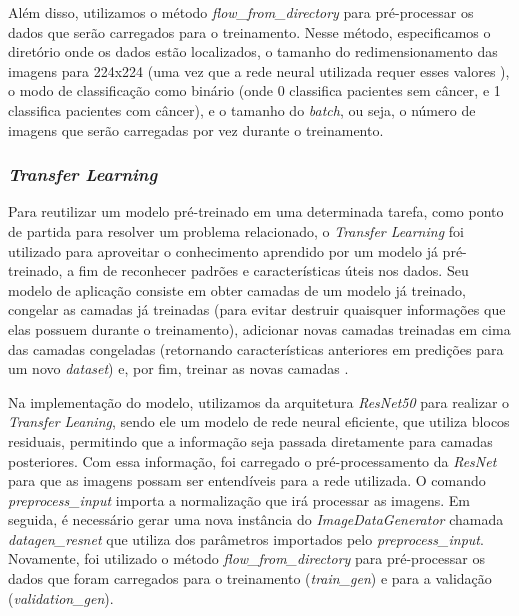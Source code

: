 Além disso, utilizamos o método \textit{flow\_from\_directory} para pré-processar os dados que serão carregados para o treinamento. Nesse método, especificamos o diretório onde os dados estão localizados, o tamanho do redimensionamento das imagens para 224x224 (uma vez que a rede neural utilizada requer esses valores ), o modo de classificação como binário (onde 0 classifica pacientes sem câncer, e 1 classifica pacientes com câncer), e o tamanho do \textit{batch}, ou seja, o número de imagens que serão carregadas por vez durante o treinamento.


\subsubsection{\esp \textit{Transfer Learning}} \label{transfer}
Para reutilizar um modelo pré-treinado em uma determinada tarefa, como ponto de partida para resolver um problema relacionado, o \textit{Transfer Learning} foi utilizado para aproveitar o conhecimento aprendido por um modelo já pré-treinado, a fim de reconhecer padrões e características úteis nos dados. Seu modelo de aplicação consiste em obter camadas de um modelo já treinado, congelar as camadas já treinadas (para evitar destruir quaisquer informações que elas possuem durante o treinamento), adicionar novas camadas treinadas em cima das camadas congeladas (retornando características anteriores em predições para um novo \textit{dataset}) e, por fim, treinar as novas camadas \cite{kerastl}.

Na implementação do modelo, utilizamos da arquitetura \textit{ResNet50} para realizar o \textit{Transfer Leaning}, sendo ele um modelo de rede neural eficiente, que utiliza blocos residuais, permitindo que a informação seja passada diretamente para camadas posteriores. Com essa informação, foi carregado o pré-processamento da \textit{ResNet} para que as imagens possam ser entendíveis para a rede utilizada. O comando \textit{preprocess\_input} importa a normalização que irá processar as imagens. Em seguida, é necessário gerar uma nova instância do \textit{ImageDataGenerator} chamada \textit{datagen\_resnet} que utiliza dos parâmetros importados pelo \textit{preprocess\_input}. Novamente, foi utilizado o método \textit{flow\_from\_directory} para pré-processar os dados que foram carregados para o treinamento (\textit{train\_gen}) e para a validação (\textit{validation\_gen}).



